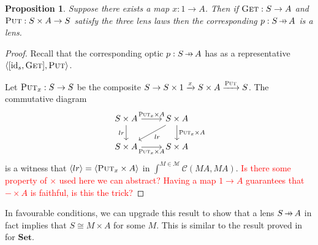 \documentclass[11pt,a4paper]{article}
\theoremstyle{plain}
\newtheorem{proposition}[theorem]{Proposition}
\theoremstyle{definition}
\newcommand{\C}{\mathscr{C}}
\newcommand{\M}{\mathscr{M}}
\newcommand{\Set}{\mathbf{Set}}
\newcommand{\id}{\mathrm{id}}
\newcommand{\fget}{\textsc{Get}}
\newcommand{\fput}{\textsc{Put}}
\newcommand{\hto}{\ensuremath{\,\mathaccent\shortmid\rightarrow\,}}
\newcommand{\todo}[1]{\textcolor{red}{\small #1}}
\begin{document}
\begin{proposition}
Suppose there exists a map $x : 1 \to A$. Then if $\fget : S \to A$ and $\fput : S \times A \to S$ satisfy the three lens laws then the corresponding $p : S \hto A$ is a lens.
\end{proposition}
\begin{proof}
Recall that the corresponding optic $p : S \hto A$ has as a representative $\langle [\id_s, \fget], \fput \rangle$.

Let $\fput_x : S \to S$ be the composite $S \to S \times 1 \xrightarrow{x} S \times A \xrightarrow{\fput} S$. The commutative diagram
\[
\begin{tikzcd}
S \times A \ar[r, "\fput_x \times A "] \ar[d, "lr", swap] & S \times A \ar[d, "\fput_x \times A"] \ar[dl, "lr"] \\
S \times A \ar[r, "\fput_x \times A", swap] & S \times A
\end{tikzcd}
\]
is a witness that $\langle lr \rangle = \langle \fput_x \times A \rangle$ in $\int^{M \in \M} \C(M A, M A)$.
\todo{Is there some property of $\times$ used here we can abstract? Having a map $1 \to A$ guarantees that $- \times A$ is faithful, is this the trick?}
\end{proof}

In favourable conditions, we can upgrade this result to show that a lens $S \hto A$ in fact implies that $S \cong M \times A$ for some $M$. This is similar to the result proved in \cite[Corollary 13]{AlgebrasAndUpdateStrategies} for $\Set$.
\end{document}

